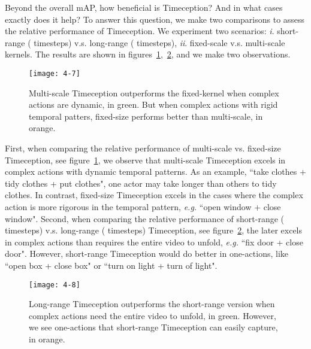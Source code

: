\documentclass[10pt,twocolumn,letterpaper]{article}
\begin{document}
Beyond the overall mAP, how beneficial is Timeception? And in what cases exactly does it help?
To answer this question, we make two comparisons to assess the relative performance of Timeception.
We experiment two scenarios:
\textit{i}. short-range ( timesteps) v.s. long-range ( timesteps),
\textit{ii}. fixed-scale v.s. multi-scale kernels.
The results are shown in figures~\ref{fig:4-7},~\ref{fig:4-8}, and we make two observations.

\begin{figure}[ht]
\begin{center}
\texttt{[image: 4-7]}
\end{center}
\caption{
Multi-scale Timeception outperforms the fixed-kernel when complex actions are dynamic, in green.
But when complex actions with rigid temporal patters, fixed-size performs better than multi-scale, in orange.}
\label{fig:4-7}
\vspace*{-3mm}
\end{figure}

First, when comparing the relative performance of multi-scale vs. fixed-size Timeception, see figure~\ref{fig:4-7}, we observe that multi-scale Timeception excels in complex actions with dynamic temporal patterns.
As an example, ``take clothes + tidy clothes + put clothes", one actor may take longer than others to tidy clothes.
In contrast, fixed-size Timeception excels in the cases where the complex action is more rigorous in the temporal pattern, \emph{e.g.} ``open window + close window".
Second, when comparing the relative performance of short-range ( timesteps) v.s. long-range ( timesteps) Timeception, see figure~\ref{fig:4-8}, the later excels in complex actions than requires the entire video to unfold, \textit{e.g.} ``fix door + close door".
However, short-range Timeception would do better in one-actions, like ``open box + close box" or ``turn on light + turn of light".

\begin{figure}[ht]
\begin{center}
\texttt{[image: 4-8]}
\end{center}
\caption{
Long-range Timeception outperforms the short-range version when complex actions need the entire video to unfold, in green.
However, we see one-actions that short-range Timeception can easily capture, in orange.}
\label{fig:4-8}
\vspace*{-3mm}
\end{figure}
\end{document}
